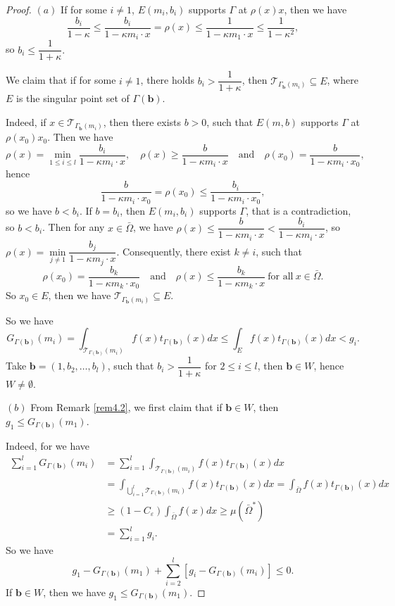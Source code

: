 \documentclass[a4paper,12pt,]{article}
\numberwithin{equation}{section}
\numberwithin{equation}{section} \allowdisplaybreaks
\begin{document}
\begin{proof}
  $(a)$ If for some $i \neq 1$, $E(m_{i},b_{i})$ supports $\Gamma$ at $\rho(x)x$, then we have
  $$\frac{b_{i}}{1 - \kappa} \leq \frac{b_{i}}{1 - \kappa m_{i} \cdot x} = \rho(x) \leq \frac{1}{1 - \kappa m_{1} \cdot x} \leq \frac{1}{1 - \kappa^{2}},$$
  so $b_{i} \leq \dfrac{1}{1 + \kappa}.$

  We claim that if for some $i \neq 1$, there holds $b_{i} > \dfrac{1}{1 + \kappa}$, then $\mathcal{T}_{\Gamma_{\mathbf{b}}(m_{i})} \subseteq E$, where $E$ is the singular point set of $\Gamma(\mathbf{b})$.

  Indeed, if $x \in \mathcal{T}_{\Gamma_{\mathbf{b}}(m_{i})}$, then there exists $b>0$, such that $E(m,b)$ supports $\Gamma$ at $\rho(x_{0})x_{0}$. Then we have
  $$\rho(x) = \min\limits_{1 \leq i \leq l}\frac{b_{i}}{1 - \kappa m_{i} \cdot x}, \quad \rho(x) \geq \frac{b}{1 - \kappa m_{i} \cdot x} \quad \text{and} \quad \rho(x_{0}) = \frac{b}{1 - \kappa m_{i} \cdot x_{0}},$$
  hence
  $$\frac{b}{1 - \kappa m_{i} \cdot x_{0}} = \rho(x_{0}) \leq \frac{b_{i}}{1 - \kappa m_{i} \cdot x_{0}},$$
  so we have $b < b_{i}$. If $b = b_{i}$, then $E(m_{i},b_{i})$ supports $\Gamma$, that is a contradiction, so $b < b_{i}$. Then for any $x \in \bar{\Omega}$, we have $\rho(x) \leq \dfrac{b}{1 - \kappa m_{i} \cdot x} < \dfrac{b_{i}}{1 - \kappa m_{i} \cdot x}$, so $\rho(x) = \min\limits_{j \neq 1}\dfrac{b_{j}}{1 - \kappa m_{j} \cdot x}$. Consequently, there exist $k \neq i$, such that
  $$\rho(x_{0}) = \frac{b_{k}}{1 - \kappa m_{k} \cdot x_{0}} \quad \text{and} \quad \rho(x) \leq \frac{b_{k}}{1 - \kappa m_{k} \cdot x}~\text{for all}~x\in \bar{\Omega}.$$
  So $x_{0} \in E$, then we have $\mathcal{T}_{\Gamma_{\mathbf{b}}(m_{i})} \subseteq E$.

  So we have
  $$G_{\Gamma(\mathbf{b})}(m_{i}) = \int_{\mathcal{T}_{\Gamma(\mathbf{b})}(m_{i})}f(x)t_{\Gamma(\mathbf{b})}(x)dx \leq  \int_{E}f(x)t_{\Gamma(\mathbf{b})}(x)dx < g_{i}.$$
  Take $\mathbf{b} = (1,b_{2}, \ldots, b_{l})$, such that $b_{i} > \dfrac{1}{1 + \kappa}$ for $2 \leq i \leq l$, then $\mathbf{b} \in W$, hence $W \neq \emptyset$.

  $(b)$ From Remark \ref{rem4.2}, we first claim that if $\mathbf{b} \in W$, then $g_{1} \leq G_{\Gamma(\mathbf{b})}(m_{1})$.

  Indeed, for we have
  \begin{align*}
     \sum_{i=1}^{l} G_{\Gamma(\mathbf{b})}(m_{i}) & =  \sum_{i=1}^{l} \int_{\mathcal{T}_{\Gamma(\mathbf{b})}(m_{i})}f(x)t_{\Gamma(\mathbf{b})}(x)dx \\
     & =  \int_{\bigcup\limits_{i=1}^{l}\mathcal{T}_{\Gamma(\mathbf{b})}(m_{i})}f(x)t_{\Gamma(\mathbf{b})}(x)dx  =  \int_{\bar{\Omega}}f(x)t_{\Gamma(\mathbf{b})}(x)dx\\
     & \geq (1 - C_{\varepsilon})\int_{\bar{\Omega}}f(x)dx \geq \mu(\bar{\Omega}^{\ast}) \\
     & = \sum_{i = 1}^{l} g_{i}.
  \end{align*}
  So we have
  $$g_{1} - G_{\Gamma(\mathbf{b})}(m_{1}) + \sum_{i=2}^{l}[g_{i} - G_{\Gamma(\mathbf{b})}(m_{i})] \leq 0. $$
  If $\mathbf{b} \in W$, then we have $g_{1} \leq G_{\Gamma(\mathbf{b})}(m_{1}).$


\end{proof}
\end{document}
